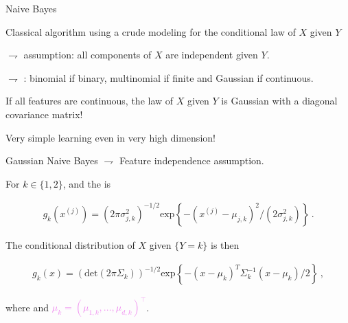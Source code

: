 \documentclass[xcolor={usenames,dvipsnames},handout]{beamer}
\begin{document}
\begin{frame}{Naive Bayes}


Classical algorithm using a \alert{crude modeling for the conditional law of $X$ given $Y$}

\vspace{.4cm}

$\rightharpoondown$  assumption: all components of $X$ are independent given $Y$.

\vspace{.2cm}

$\rightharpoondown$ : binomial if binary, multinomial if finite and Gaussian if continuous. 

\vspace{.2cm}

If all features are continuous, the law of $X$ given $Y$ is Gaussian with a {\color{Vert} diagonal covariance matrix}!

\vspace{.2cm}

Very simple learning even in \alert{very high dimension!}

\end{frame}

\begin{frame}{Gaussian Naive Bayes}
$\rightharpoondown$ \alert{Feature  independence} assumption.

\vspace{.2cm}

For $k\in\{1,2\}$,  and the  is 

\begin{align*}
g_k(x^{(j)}) = (2\pi\sigma^2_{j,k})^{-1/2}\mathrm{exp}\left\{-(x^{(j)}-\mu_{j,k})^2/(2\sigma^2_{j,k})\right\}\,.
\end{align*}

\vspace{.2cm}

The conditional distribution of $X$ given $\{Y = k\}$ is then

\begin{align*}
g_k(x) = (\mathrm{det}(2\pi \Sigma_k))^{-1/2}\mathrm{exp}\left\{-(x-\mu_{k})^T\Sigma_k^{-1}(x-\mu_{k})/2\right\}\,,
\end{align*}

\vspace{.2cm}

where  and \textcolor{violet}{$\mu_k = (\mu_{1,k},\ldots,\mu_{d,k})^\top$}.

\end{frame}
\end{document}
